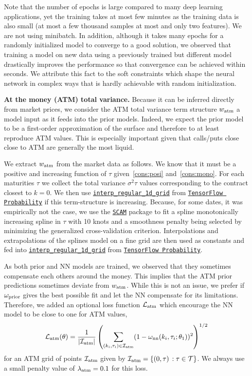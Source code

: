 Note that the number of epochs is large compared to many deep learning applications, yet the training takes at most few minutes as the training data is also small (at most a few thousand samples at most and only two features).
We are not using minibatch.
In addition, although it takes many epochs for a randomly initialized model to converge to a good solution, we observed that training a model on new data using a previously trained but different model drastically improves the performance so that convergence can be achieved within seconds.
We attribute this fact to the soft constraints which shape the neural network in complex ways that is hardly achievable with random initialization.

\textbf{At the money (ATM) total variance.} 
Because it can be inferred directly from market prices, we consider the ATM total variance term structure $w_{\rm atm}$ a model input as it feeds into the prior models.
Indeed, we expect the prior model to be a first-order approximation of the surface and therefore to at least reproduce ATM values.
This is especially important given that calls/puts close close to ATM are generally the most liquid.

We extract $w_{\rm atm}$ from the market data as follows.
We know that it must be a positive and increasing function of $\tau$ given~\ref{cons:posi} and~\ref{cons:mono}.
For each maturities $\tau$ we collect the total variance $\sigma^2\tau$ values corresponding to the contract closest to $k=0$.
We then use \href{https://www.tensorflow.org/probability/api_docs/python/tfp/math/interp_regular_1d_grid}{\texttt{interp\_regular\_1d\_grid}} from \href{https://www.tensorflow.org/probability}{\texttt{TensorFlow Probability}} if this term-structure is increasing.
Because, for some dates, it was empirically not the case, we use the \href{https://cran.r-project.org/web/packages/scam/scam.pdf}{\texttt{SCAM}} package to fit a spline monotonically increasing spline in $\tau$ with 10 knots and a smoothness penalty being selected by minimizing the generalized cross-validation criterion.
Interpolations and extrapolations of the splines model on a fine grid are then used as constants and fed into 
\href{https://www.tensorflow.org/probability/api_docs/python/tfp/math/interp_regular_1d_grid}{\texttt{interp\_regular\_1d\_grid}} from \href{https://www.tensorflow.org/probability}{\texttt{TensorFlow Probability}}.

As both prior and NN models are trained, we observed that they sometimes compensate each others around the money.
This implies that the ATM prior predictions sometimes deviate from $w_{\rm atm}$.
While this is not an issue, we prefer if $\omega_{\rm prior}$ gives the best possible fit and let the NN compensate for its limitations.
Therefore, we added an optional loss function ${\mathcal L}_{\rm atm}$ which encourage the NN model to be close to one for ATM values,
$$
{\mathcal L}_{\rm atm} (\theta) = 
\frac{1}{|{{\mathcal I}_{\rm atm}}|} \left( \sum_{(k_i,\tau_i)\in{{\mathcal I}_{\rm atm}}} (1 - \omega_{\rm nn}(k_i,\tau_i;\theta_1) )^2\right)^{1/2}
$$
for an ATM grid of points ${{\mathcal I}_{\rm atm}}$ given by $
{{\mathcal I}_{\rm atm}} = \{(0,\tau) \, : \tau \in {\mathcal T}\}$.
We always use a small penalty value of $\lambda_{\rm atm} = 0.1$ for this loss.

